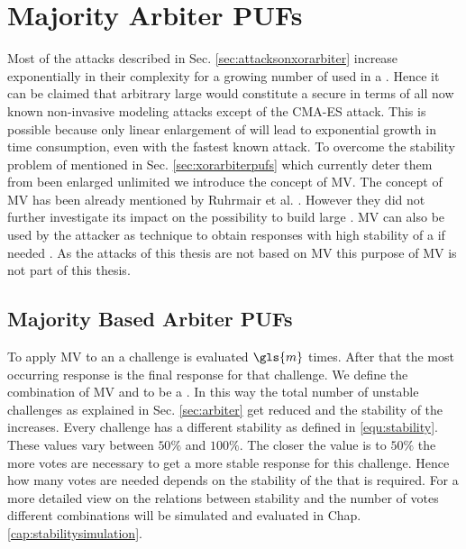 \chapter{Majority Arbiter PUFs}
\label{cap:majorityarbiter}

Most of the attacks described in Sec. \ref{sec:attacksonxorarbiter} increase exponentially in their complexity for a growing number of used \apufs in a \xpuf. 
Hence it can be claimed that arbitrary large \xpufs would constitute a secure \puf in terms of all now known non-invasive modeling attacks except of the \ac{CMA-ES} attack.
This is possible because only linear enlargement of \xpufs will lead to exponential growth in time consumption, even with the fastest known attack.
To overcome the stability problem of \xpufs mentioned in Sec. \ref{sec:xorarbiterpufs} which currently deter them from been enlarged unlimited we introduce the concept of \ac{MV}. %
The concept of \ac{MV} has been already mentioned by Ruhrmair et al. \cite{Ruhrmair2013PUFData}.
However they did not further investigate its impact on the possibility to build large \xpufs.
\ac{MV} can also be used by the attacker as technique to obtain responses with high stability of a \puf if needed \cite{Ganji2016PACPUFs, Ozturk2008TowardsDevices}.
As the attacks of this thesis are not based on \ac{MV} this purpose of \ac{MV} is not part of this thesis.

\section{Majority Based Arbiter PUFs}
\label{sec:majorityarbiter}

To apply \ac{MV} to an \apuf a challenge is evaluated $\gls{m}$ times.
After that the most occurring response is the final response for that challenge.
We define the combination of \ac{MV} and \apuf to be a \mpuf.
In this way the total number of unstable challenges as explained in Sec. \ref{sec:arbiter} get reduced and the stability of the \apuf increases.
Every challenge has a different stability as defined in \ref{equ:stability}.%
These values vary between $50 \%$ and $100 \%$.
The closer the value is to $50 \%$ the more votes are necessary to get a more stable response for this challenge.
Hence how many votes are needed depends on the stability of the \apuf that is required. 
For a more detailed view on the relations between stability and the number of votes different combinations will be simulated and evaluated in Chap. \ref{cap:stabilitysimulation}.

